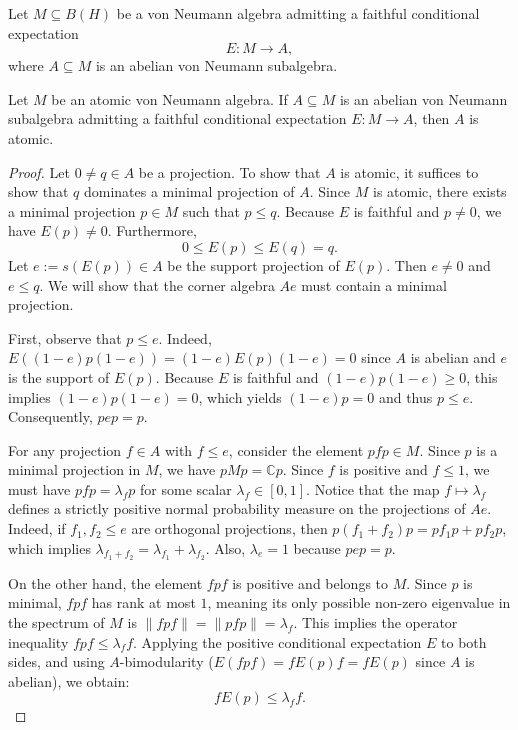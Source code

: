 Let $M \subseteq B(H)$ be a von Neumann algebra admitting a faithful conditional expectation
\[
E : M \to A,
\]
where $A \subseteq M$ is an abelian von Neumann subalgebra.

\begin{lemma}\label{lem:atomic_subalgebra}
Let $M$ be an atomic von Neumann algebra. If $A \subseteq M$ is an abelian von Neumann subalgebra admitting a faithful conditional expectation $E : M \to A$, then $A$ is atomic.
\end{lemma}

\begin{proof}
Let $0 \neq q \in A$ be a projection. To show that $A$ is atomic, it suffices to show that $q$ dominates a minimal projection of $A$.
Since $M$ is atomic, there exists a minimal projection $p \in M$ such that $p \leq q$.
Because $E$ is faithful and $p \neq 0$, we have $E(p) \neq 0$. Furthermore,
\[
0 \leq E(p) \leq E(q) = q.
\]
Let $e := s(E(p)) \in A$ be the support projection of $E(p)$. Then $e \neq 0$ and $e \leq q$. We will show that the corner algebra $Ae$ must contain a minimal projection.

First, observe that $p \leq e$. Indeed, $E((1-e)p(1-e)) = (1-e)E(p)(1-e) = 0$ since $A$ is abelian and $e$ is the support of $E(p)$. Because $E$ is faithful and $(1-e)p(1-e) \ge 0$, this implies $(1-e)p(1-e) = 0$, which yields $(1-e)p = 0$ and thus $p \leq e$. Consequently, $pep = p$.

For any projection $f \in A$ with $f \leq e$, consider the element $pfp \in M$. Since $p$ is a minimal projection in $M$, we have $pMp = \mathbb{C}p$. Since $f$ is positive and $f \le 1$, we must have $pfp = \lambda_f p$ for some scalar $\lambda_f \in [0,1]$.
Notice that the map $f \mapsto \lambda_f$ defines a strictly positive normal probability measure on the projections of $Ae$. Indeed, if $f_1, f_2 \leq e$ are orthogonal projections, then $p(f_1 + f_2)p = pf_1p + pf_2p$, which implies $\lambda_{f_1+f_2} = \lambda_{f_1} + \lambda_{f_2}$. Also, $\lambda_e = 1$ because $pep = p$.

On the other hand, the element $fpf$ is positive and belongs to $M$. Since $p$ is minimal, $fpf$ has rank at most $1$, meaning its only possible non-zero eigenvalue in the spectrum of $M$ is $\|fpf\| = \|pfp\| = \lambda_f$. This implies the operator inequality $fpf \leq \lambda_f f$.
Applying the positive conditional expectation $E$ to both sides, and using $A$-bimodularity ($E(fpf) = fE(p)f = fE(p)$ since $A$ is abelian), we obtain:
\[
f E(p) \leq \lambda_f f.
\]


\end{proof}
